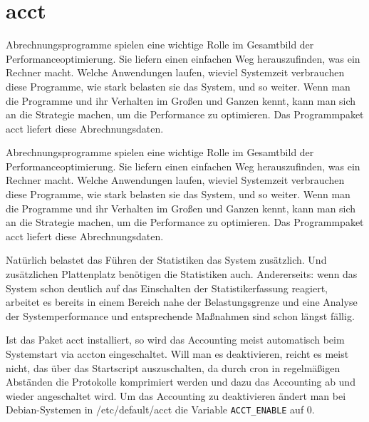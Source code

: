 \section{acct}
\label{sec:lokal-werkzeuge-acct}
\begin{abstractsec}
  Abrechnungsprogramme spielen eine wichtige Rolle im Gesamtbild der
  Performanceoptimierung. Sie liefern einen einfachen Weg herauszufinden, was
  ein Rechner macht. Welche Anwendungen laufen, wieviel Systemzeit verbrauchen
  diese Programme, wie stark belasten sie das System, und so weiter. Wenn man
  die Programme und ihr Verhalten im Großen und Ganzen kennt, kann man sich
  an die Strategie machen, um die Performance zu optimieren. Das Programmpaket
  acct liefert diese Abrechnungsdaten.
\end{abstractsec}
\begin{normaltext}
  Abrechnungsprogramme spielen eine wichtige Rolle im Gesamtbild der
  Performanceoptimierung. Sie liefern einen einfachen Weg herauszufinden, was
  ein Rechner macht. Welche Anwendungen laufen, wieviel Systemzeit verbrauchen
  diese Programme, wie stark belasten sie das System, und so weiter. Wenn man
  die Programme und ihr Verhalten im Großen und Ganzen kennt, kann man sich
  an die Strategie machen, um die Performance zu optimieren. Das Programmpaket
  acct liefert diese Abrechnungsdaten.

  Natürlich belastet das Führen der Statistiken das System zusätzlich. Und
  zusätzlichen Plattenplatz benötigen die Statistiken auch. Andererseits: wenn
  das System schon deutlich auf das Einschalten der Statistikerfassung
  reagiert, arbeitet es bereits in einem Bereich nahe der Belastungsgrenze und
  eine Analyse der Systemperformance und entsprechende Maßnahmen sind schon
  längst fällig.

  Ist das Paket acct installiert, so wird das Accounting meist automatisch
  beim Systemstart via accton eingeschaltet. Will man es deaktivieren, reicht
  es meist nicht, das über das Startscript auszuschalten, da durch cron in
  regelmäßigen Abständen die Protokolle komprimiert werden und dazu das
  Accounting ab und wieder angeschaltet wird. Um das Accounting zu
  deaktivieren ändert man bei Debian-Systemen in /etc/default/acct die
  Variable \verb?ACCT_ENABLE? auf 0.


\end{normaltext}
